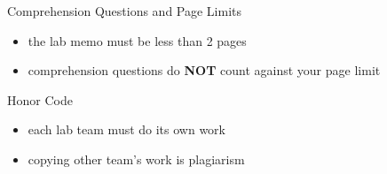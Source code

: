 \begin{frame}{Comprehension Questions and Page Limits}
\label{comprehension-questions-and-page-limits}
\begin{itemize}
\tightlist
\item
  the lab memo must be less than 2 pages
\item
  comprehension questions do \textbf{NOT} count against your page limit
\end{itemize}
\end{frame}

\begin{frame}{Honor Code}
\label{honor-code}
\begin{itemize}
\tightlist
\item
  each lab team must do its own work
\item
  copying other team's work is plagiarism
\end{itemize}
\end{frame}
